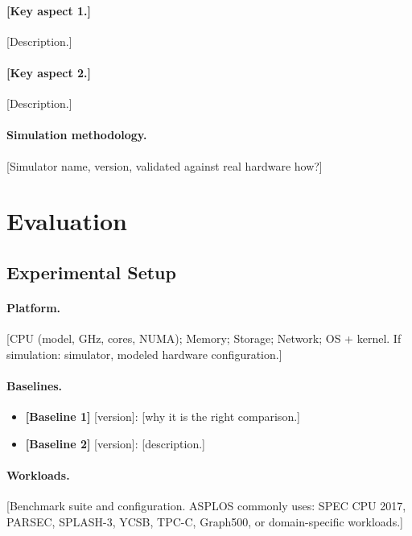 \documentclass[sigplan,nonacm]{acmart}
\begin{document}
\paragraph{[Key aspect 1.]} [Description.]
\paragraph{[Key aspect 2.]} [Description.]

\paragraph{Simulation methodology.}
[Simulator name, version, validated against real hardware how?]


\section{Evaluation}
\label{sec:eval}

\subsection{Experimental Setup}

\paragraph{Platform.}
[CPU (model, GHz, cores, NUMA); Memory; Storage; Network; OS + kernel.
If simulation: simulator, modeled hardware configuration.]

\paragraph{Baselines.}
\begin{itemize}
  \item \textbf{[Baseline 1]} [version]: [why it is the right comparison.]
  \item \textbf{[Baseline 2]} [version]: [description.]
\end{itemize}

\paragraph{Workloads.}
[Benchmark suite and configuration. ASPLOS commonly uses: SPEC CPU 2017, PARSEC,
SPLASH-3, YCSB, TPC-C, Graph500, or domain-specific workloads.]
\end{document}
